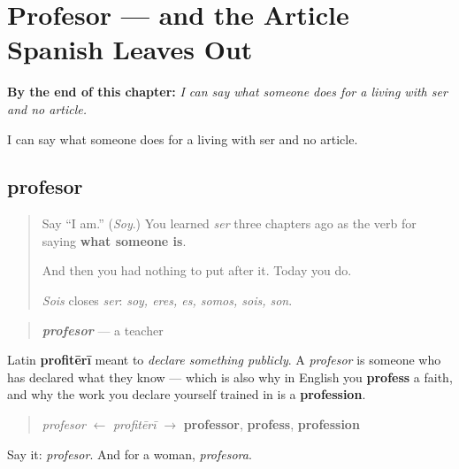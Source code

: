 
\chapter{Profesor --- and the Article Spanish Leaves Out}
\label{ch:profesor}

\begin{chapteropening}
\textbf{By the end of this chapter:} \emph{I can say what someone does for a living with ser and no article.}

I can say what someone does for a living with ser and no article.
\end{chapteropening}

\section[profesor]{profesor}

\label{lesson:ES-C09-profesor}



\begin{quote}
Say \textquotedblleft{}I am.\textquotedblright{} (\emph{Soy}.) You learned \emph{ser} three chapters ago as the verb for saying \textbf{what someone is}.

And then you had nothing to put after it. Today you do.

\emph{Sois} closes \emph{ser}: \emph{soy, eres, es, somos, sois, son}.
\end{quote}

\begin{cousinweb}
\begin{quote}
\emph{\textbf{profesor}} — a teacher
\end{quote}

Latin \textbf{profitērī} meant to \emph{declare something publicly}. A \emph{profesor} is someone who has declared what they know — which is also why in English you \textbf{profess} a faith, and why the work you declare yourself trained in is a \textbf{profession}.

\begin{quote}
\emph{profesor} $\leftarrow$ \emph{profitērī} $\to$ \textbf{professor}, \textbf{profess}, \textbf{profession}
\end{quote}

Say it: \emph{profesor}. And for a woman, \emph{profesora}.
\end{cousinweb}

